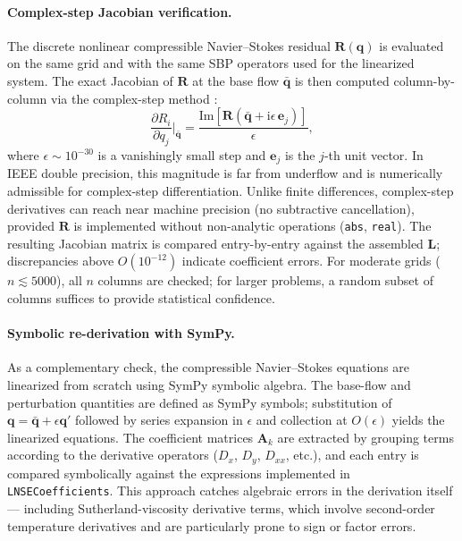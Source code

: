 \documentclass[11pt]{article}
\newcommand{\pp}{\partial}
\newcommand{\bq}{\mathbf{q}}
\newcommand{\bqp}{\mathbf{q}'}
\newcommand{\bqbar}{\bar{\mathbf{q}}}
\newcommand{\bA}{\mathbf{A}}
\newcommand{\bL}{\mathbf{L}}
\newcommand{\bR}{\mathbf{R}}
\begin{document}
\paragraph{Complex-step Jacobian verification.}
The discrete nonlinear compressible Navier--Stokes residual $\bR(\bq)$ is evaluated on the same grid and with the same SBP operators used for the linearized system.
The exact Jacobian of $\bR$ at the base flow $\bqbar$ is then computed column-by-column via the complex-step method \cite{squire1998using,martins2003complex}:
\begin{equation}
  \frac{\pp R_i}{\pp q_j}\bigg|_{\bqbar}
  = \frac{\mathrm{Im}\!\left[\bR(\bqbar + \mathrm{i}\epsilon\,\mathbf{e}_j)\right]}{\epsilon},
  \label{eq:complex_step}
\end{equation}
where $\epsilon \sim 10^{-30}$ is a vanishingly small step and $\mathbf{e}_j$ is the $j$-th unit vector.
In IEEE double precision, this magnitude is far from underflow and is numerically admissible for complex-step differentiation.
Unlike finite differences, complex-step derivatives can reach near machine precision (no subtractive cancellation), provided $\bR$ is implemented without non-analytic operations (\texttt{abs}, \texttt{real}).
The resulting Jacobian matrix is compared entry-by-entry against the assembled $\bL$; discrepancies above $O(10^{-12})$ indicate coefficient errors.
For moderate grids ($n \lesssim 5000$), all $n$ columns are checked; for larger problems, a random subset of columns suffices to provide statistical confidence.

\paragraph{Symbolic re-derivation with SymPy.}
As a complementary check, the compressible Navier--Stokes equations are linearized from scratch using SymPy symbolic algebra.
The base-flow and perturbation quantities are defined as SymPy symbols; substitution of $\bq = \bqbar + \epsilon\bqp$ followed by series expansion in $\epsilon$ and collection at $O(\epsilon)$ yields the linearized equations.
The coefficient matrices $\bA_k$ are extracted by grouping terms according to the derivative operators ($D_x$, $D_y$, $D_{xx}$, etc.), and each entry is compared symbolically against the expressions implemented in \texttt{LNSECoefficients}.
This approach catches algebraic errors in the derivation itself --- including Sutherland-viscosity derivative terms, which involve second-order temperature derivatives and are particularly prone to sign or factor errors.
\end{document}
